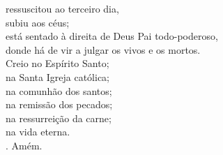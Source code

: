 \documentclass{book}
\begin{document}
\begin{flushleft}
    ressuscitou ao terceiro dia, \\
    subiu aos céus; \\
    está sentado à direita de Deus Pai todo-poderoso, \\
    donde há de vir a julgar os vivos e os mortos. \\
    Creio no Espírito Santo; \\
    na Santa Igreja católica; \\
    na comunhão dos santos; \\
    na remissão dos pecados; \\
    na ressurreição da carne; \\
    na vida eterna. \\
    {\color{red} \Rbar.} Amém.

    \newpage


\end{flushleft}
\end{document}
